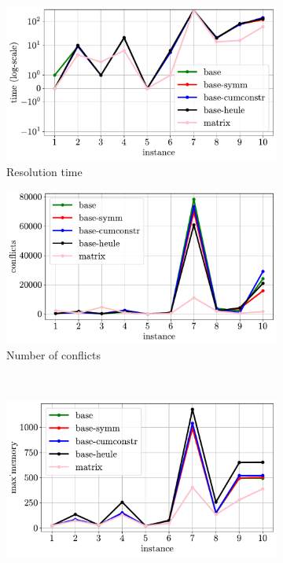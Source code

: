 \begin{figure}[h]
    \centering
    \begin{subfigure}{0.49\linewidth}
        \centering
        \includegraphics[width=\linewidth]{img/sat/time.pdf}
        \caption{Resolution time}
    \end{subfigure}
    \hfill
    \centering
    \begin{subfigure}{0.49\linewidth}
        \centering
        \includegraphics[width=\linewidth]{img/sat/conflicts.pdf}
        \caption{Number of conflicts}
    \end{subfigure}
    \\
    \centering
    \begin{subfigure}{0.49\linewidth}
        \centering
        \includegraphics[width=\linewidth]{img/sat/max_memory.pdf}

\end{subfigure}
\end{figure}
